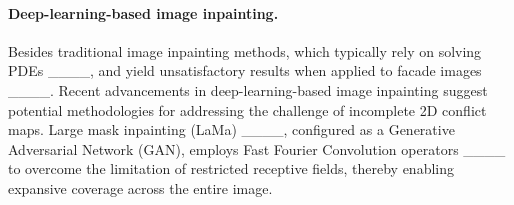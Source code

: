 \paragraph{Deep-learning-based image inpainting.}
Besides traditional image inpainting methods, which typically rely on solving \gls{PDE}s ____, and yield unsatisfactory results when applied to facade images ____. 
Recent advancements in deep-learning-based image inpainting suggest potential methodologies for addressing the challenge of incomplete 2D conflict maps. 
Large mask inpainting (LaMa) ____, configured as a Generative Adversarial Network (GAN), employs Fast Fourier Convolution operators ____ to overcome the limitation of restricted receptive fields, thereby enabling expansive coverage across the entire image.


